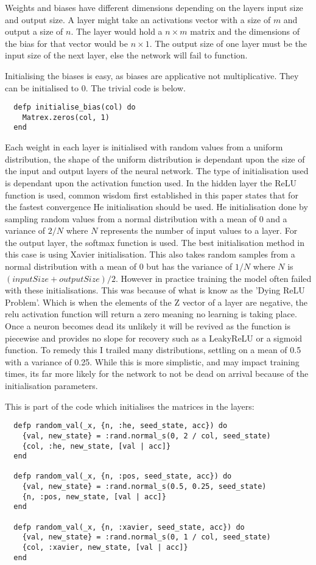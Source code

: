Weights and biases have different dimensions depending on the layers input size
and output size. A layer might take an activations vector with a size of \(m\) and
output a size of \(n\). The layer would hold a \(n \times m\) matrix
and the dimensions of the bias for that vector would be \(n \times 1\). The
output size of one layer must be the input size of the next layer, else the
network will fail to function.

Initialising the biases is easy, as biases are applicative not multiplicative.
They can be initialised to 0. The trivial code is below.
\begin{lstlisting}
  defp initialise_bias(col) do
    Matrex.zeros(col, 1)
  end
  \end{lstlisting} 

Each weight in each layer is initialised with random values from a uniform
distribution, the shape of the uniform distribution is dependant upon the size
of the input and output layers of the neural network. The type of initialisation
used is dependant upon the activation function used. In the hidden layer the
ReLU function is used, common wisdom first established in this paper
\cite{he2015delving} states that for the fastest convergence He initialisation
should be used. He initialisation done by sampling random values from a normal
distribution with a mean of 0 and a variance of \( 2/N \) where \(N\) represents
the number of input values to a layer. For the output layer, the softmax
function is used. The best initialisation method in this case is using Xavier
initialisation.\cite{glorot2010understanding} This also takes random samples
from a normal distribution with a mean of 0 but has the variance of \( 1/N \)
where \(N\) is \( (inputSize + outputSize) / 2 \). However in practice training
the model often failed with these initialisations. This was because of what is
know as the 'Dying ReLU Problem'. Which is when the elements of the Z vector of
a layer are negative, the relu activation function will return a zero meaning no
learning is taking place. Once a neuron becomes dead its unlikely it will be
revived as the function is piecewise and provides no slope for recovery such as
a LeakyReLU or a sigmoid function. To remedy this I trailed many distributions,
settling on a mean of 0.5 with a variance of 0.25. While this is more
simplistic, and may impact training times, its far more likely for the network
to not be dead on arrival because of the initialisation parameters.

This is part of the code which initialises the matrices in the layers:
\begin{lstlisting}
  defp random_val(_x, {n, :he, seed_state, acc}) do
    {val, new_state} = :rand.normal_s(0, 2 / col, seed_state)
    {col, :he, new_state, [val | acc]}
  end

  defp random_val(_x, {n, :pos, seed_state, acc}) do
    {val, new_state} = :rand.normal_s(0.5, 0.25, seed_state)
    {n, :pos, new_state, [val | acc]}
  end

  defp random_val(_x, {n, :xavier, seed_state, acc}) do
    {val, new_state} = :rand.normal_s(0, 1 / col, seed_state)
    {col, :xavier, new_state, [val | acc]}
  end
\end{lstlisting}


